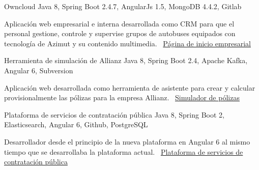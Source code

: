 \documentclass[]{awesome-cv}
\begin{document}
\begin{cventries}
	\vspace{-3mm}
	\cventry
	{}
	{Owncloud \vspace{-5mm}}
	{Java 8, Spring Boot 2.4.7, AngularJs 1.5, MongoDB 4.4.2, Gitlab \vspace{-5mm}}
	{}
	{\begin{cvsectionnormaltext}
		\item {Aplicación web empresarial e interna desarrollada como CRM para que el personal gestione, controle y supervise grupos de autobuses equipados con tecnología de Azimut y su contenido multimedia. 
		\newline \faLink\ \href{https://www.azimutelectronics.com}{Página de inicio empresarial}}
	\end{cvsectionnormaltext}}

	\vspace{-3mm}
	\cventry
	{}
	{Herramienta de simulación de Allianz \vspace{-5mm}}
	{Java 8, Spring Boot 2.4, Apache Kafka, Angular 6, Subversion \vspace{-5mm}}
	{}
	{\begin{cvsectionnormaltext}
		\item{Aplicación web desarrollada como herramienta de asistente para crear y calcular provisionalmente las pólizas para la empresa Allianz.
      \newline \faLink\ \href{https://www.allianzdirect.es/seguro-de-coche/calcular-precio/}{Simulador de pólizas}}
	\end{cvsectionnormaltext}}
	
	\vspace{-3mm}
	\cventry
	{}
	{Plataforma de servicios de contratación pública \vspace{-5mm}}
	{Java 8, Spring Boot 2, Elasticsearch, Angular 6, Github, PostgreSQL \vspace{-5mm}}
	{}
	{\begin{cvsectionnormaltext}
		\item{Desarrollador desde el principio de la nueva plataforma en Angular 6 al mismo tiempo que se desarrollaba la plataforma actual.
		\newline \faLink\ \href{https://contractaciopublica.cat/ca/inici}{Plataforma de servicios de contratación pública}}
	\end{cvsectionnormaltext}}


\end{cventries}
\end{document}
